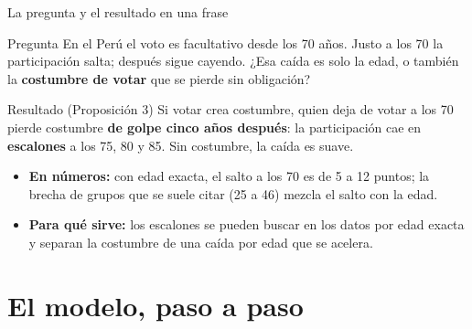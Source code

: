 \documentclass[aspectratio=169,11pt,xcolor=table]{beamer}
\newcommand{\1}{\mathbbm{1}}
\begin{document}
\begin{frame}{La pregunta y el resultado en una frase}
  \begin{block}{Pregunta}
    En el Perú el voto es facultativo desde los 70 años. Justo a los 70 la participación salta; después
    sigue cayendo. ¿Esa caída es solo la edad, o también la \textbf{costumbre de votar} que se pierde sin obligación?
  \end{block}
  \vspace{0.15cm}
  \begin{block}{Resultado (Proposición 3)}
    Si votar crea costumbre, quien deja de votar a los 70 pierde costumbre \textbf{de golpe cinco años después}:
    la participación cae en \textbf{escalones} a los 75, 80 y 85. Sin costumbre, la caída es suave.
  \end{block}
  \vspace{0.1cm}
  \begin{itemize}\setlength{\itemsep}{0.35em}\small
    \item \textbf{En números:} con edad exacta, el salto a los 70 es de 5 a 12 puntos; la brecha de grupos que se suele citar (25 a 46) mezcla el salto con la edad.
    \item \textbf{Para qué sirve:} los escalones se pueden buscar en los datos por edad exacta y separan la costumbre de una caída por edad que se acelera.
  \end{itemize}
\end{frame}

\section[2 Modelo]{El modelo, paso a paso}
\end{document}
